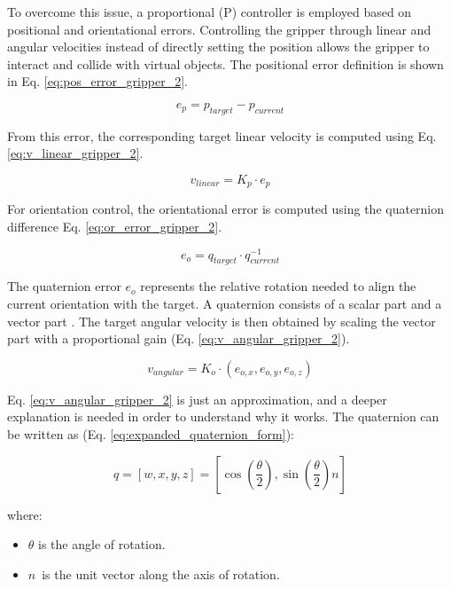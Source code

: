 \bigskip \noindent
To overcome this issue, a proportional (P) controller is employed based on positional and orientational errors. Controlling the gripper through linear and angular velocities instead of directly setting the position allows the gripper to interact and collide with virtual objects. The positional error definition is shown in Eq. \ref{eq:pos_error_gripper_2}. 

\begin{equation} e_p = p_{target} - p_{current} \label{eq:pos_error_gripper_2} \end{equation}

\noindent
From this error, the corresponding target linear velocity is computed using Eq. \ref{eq:v_linear_gripper_2}.

\begin{equation} v_{linear} = K_p \cdot e_p \label{eq:v_linear_gripper_2} \end{equation}

\noindent
For orientation control, the orientational error is computed using the quaternion difference Eq. \ref{eq:or_error_gripper_2}.

\begin{equation} e_o = q_{target} \cdot q_{current}^{-1} \label{eq:or_error_gripper_2} \end{equation}

\noindent
The quaternion error $e_o$ represents the relative rotation needed to align the current orientation with the target. A quaternion consists of a scalar part and a vector part \cite{siciliano2010robotics}. The target angular velocity is then obtained by scaling the vector part with a proportional gain (Eq. \ref{eq:v_angular_gripper_2}).

\begin{equation} v_{angular} = K_o \cdot (e_{o,x}, e_{o,y}, e_{o,z}) \label{eq:v_angular_gripper_2} \end{equation}

\noindent
Eq. \ref{eq:v_angular_gripper_2} is just an approximation, and a deeper explanation is needed in order to understand why it works. The quaternion can be written as (Eq. \ref{eq:expanded_quaternion_form}):

\begin{equation} q = [w, x, y, z] = \left[ \cos\left(\frac{\theta}{2}\right), \sin\left(\frac{\theta}{2}\right) n \right] \label{eq:expanded_quaternion_form} \end{equation}

where:
\begin{itemize}
\item \( \theta \) is the angle of rotation.
\item \( n \) is the unit vector along the axis of rotation.
\end{itemize}

